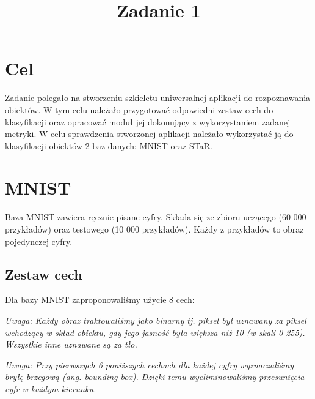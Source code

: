 \documentclass{classrep}
\author{
  \studentinfo{Hubert Marcinkowski}{214942} \and
  \studentinfo{Artur Wróblewski}{214985}
}
\title{Zadanie 1}
\begin{document}
\maketitle


\section{Cel}
Zadanie polegało na stworzeniu szkieletu uniwersalnej aplikacji do rozpoznawania obiektów. W tym celu należało przygotować odpowiedni zestaw cech do klasyfikacji oraz opracować moduł jej dokonujący z wykorzystaniem zadanej metryki. W celu sprawdzenia stworzonej aplikacji należało wykorzystać ją do klasyfikacji obiektów 2 baz danych: MNIST oraz STaR.

\section{MNIST}

Baza MNIST zawiera ręcznie pisane cyfry. Składa się ze zbioru uczącego (60 000 przykładów) oraz testowego (10 000 przykładów). Każdy z przykładów to obraz pojedynczej cyfry.

\subsection{Zestaw cech}

Dla bazy MNIST zaproponowaliśmy użycie 8 cech:

\textsl{Uwaga: Każdy obraz traktowaliśmy jako binarny tj. piksel był uznawany za piksel wchodzący w skład obiektu, gdy jego jasność była większa niż 10 (w skali 0-255). Wszystkie inne uznawane są za tło.}

\textsl{Uwaga: Przy pierwszych 6 poniższych cechach dla każdej cyfry wyznaczaliśmy bryłę brzegową (ang. bounding box). Dzięki temu wyeliminowaliśmy przesunięcia cyfr w każdym kierunku.}
\end{document}
